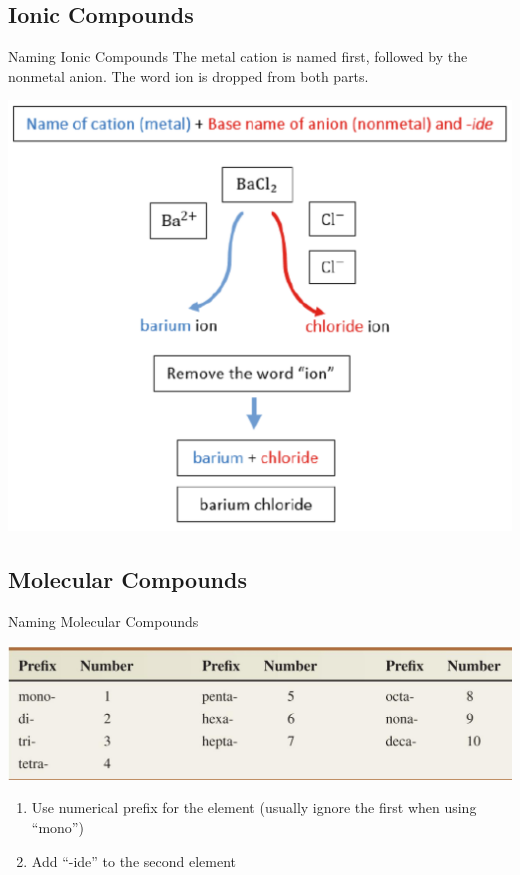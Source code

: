 \documentclass[11pt]{beamer}
\begin{document}
\subsection{Ionic Compounds}

\begin{frame}{Naming Ionic Compounds}
  The metal cation is named first, followed by the nonmetal anion.
  The word ion is dropped from both parts.

  \centering
  \includegraphics[width=0.7\linewidth]{barium_examp.png}
\end{frame}

\subsection{Molecular Compounds}

\begin{frame}{Naming Molecular Compounds}
  \begin{center}
    \includegraphics[width=\linewidth]{prefix_name}
  \end{center}
  
  \begin{enumerate}
  \item Use numerical prefix for the element (usually ignore the first
    when using ``mono'')
  \item Add ``-ide'' to the second element
  \end{enumerate}
\end{frame}
\end{document}
